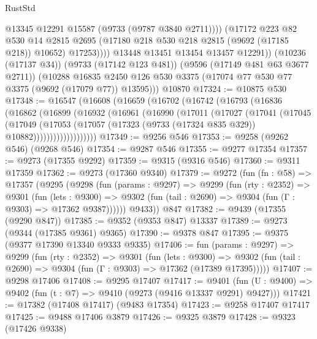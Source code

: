 \begin{lexlean}{RustStd}
\begin{coremodule}
{\begin{coremodule}
{{{{{{{{{{{{{{{{{{{{{{{{{{{{{{{{{{{{{{{{{{{{{{{{{{{{{{{                    @13345
                    @12291
                    @15587
                    (@9733 (@9787 @3840 @2711))))
                (@17172
                  @223
                  @82
                  @530
                  @14
                  @2815
                  @2695
                  (@17180 @218 @530 @218 @2815 (@9692 (@17185 @218)) @10652)
                  @17253))))
          @13448
          @13451
          @13454
          @13457
          @12291))
      (@10236 (@17137 @34))
      (@9733 (@17142 @123 @481))
      (@9596 (@17149 @481 @63 @3677 @2711))
      (@10288 @16835 @2450 @126 @530 @3375 (@17074 @77 @530 @77 @3375 (@9692 (@17079 @77)) @13595)))
    @10870
@17324 := @10875 @530
@17348 := @16547
    (@16608
      (@16659
        (@16702
          (@16742
            (@16793
              (@16836
                (@16862
                  (@16899
                    (@16932
                      (@16961
                        (@16990
                          (@17011
                            (@17027
                              (@17041
                                (@17045
                                  (@17049
                                    (@17053
                                      (@17057
                                        (@17323 (@9733 (@17324 @835 @329)) @10882)))))))))))))))))))
@17349 := @9256 @546
@17353 := @9258 (@9262 @546) (@9268 @546)
@17354 := @9287 @546
@17355 := @9277 @17354
@17357 := @9273 (@17355 @9292)
@17359 := @9315 (@9316 @546)
@17360 := @9311 @17359
@17362 := @9273 (@17360 @9340)
@17379 := @9272
    (fun (fn : @58) =>
    @17357
      (@9295
        (@9298
          (fun (params : @9297) =>
          @9299
            (fun (rty : @2352) =>
            @9301
              (fun (lets : @9300) =>
              @9302 (fun (tail : @2690) => @9304 (fun (Γ : @9303) => @17362 @9387))))))
        @9433))
    @847
@17382 := @9439 (@17355 (@9290 @847))
@17385 := @9352 (@9353 @847) @13337
@17389 := @9273 (@9344 (@17385 @9361) @9365)
@17390 := @9378 @847
@17395 := @9375 (@9377 @17390 @13340 @9333 @9335)
@17406 := fun (params : @9297) =>
  @9299
    (fun (rty : @2352) =>
    @9301
      (fun (lets : @9300) =>
      @9302 (fun (tail : @2690) => @9304 (fun (Γ : @9303) => @17362 (@17389 @17395)))))
@17407 := @9298 @17406
@17408 := @9295 @17407
@17417 := @9401
    (fun (U : @9400) => @9402 (fun (t : @7) => @9410 (@9273 (@9416 @13337 @9291) @9427)))
@17421 := @17382 (@17408 @17417) (@9483 @17354)
@17423 := @9258 @17407 @17417
@17425 := @9488 @17406 @3879
@17426 := @9325 @3879
@17428 := @9323 (@17426 @9338)
}}}}}}}}}}}}}}}}}}}}}}}}}}}}}}}}}}}}}}}}}}}}}}}}}}}}}}}
\end{coremodule}}
\end{coremodule}
\end{lexlean}
